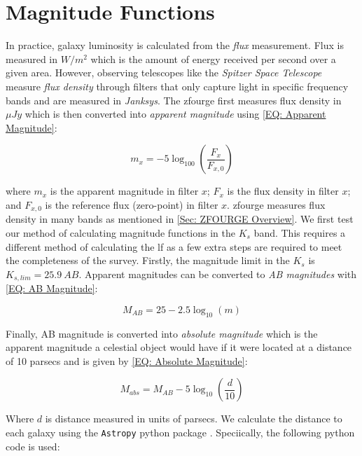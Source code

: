 \section{Magnitude Functions}

In practice, galaxy luminosity is calculated from the \textit{flux} measurement. Flux is measured in $W/m^2$ which is the amount of energy received per second over a given area. However, observing telescopes like the \textit{Spitzer Space Telescope} measure \textit{flux density} through filters that only capture light in specific frequency bands and are measured in \textit{Janksys}. The \gls{zfourge} first measures flux density in $\mu Jy$ which is then converted into \textit{apparent magnitude} using \cref{EQ: Apparent Magnitude}: 

\begin{equation}
    m_{x} = -5 \log_{100} \left(\frac{F_{x}}{F_{x,0}}\right)
    \label{EQ: Apparent Magnitude}
\end{equation}

where $m_x$ is the apparent magnitude in filter $x$; $F_x$ is the flux density in filter $x$; and $F_{x,0}$ is the reference flux (zero-point) in filter $x$. \gls{zfourge} measures flux density in many bands as mentioned in \cref{Sec: ZFOURGE Overview}. We first test our method of calculating magnitude functions in the $K_{s}$ band. This requires a different method of calculating the \gls{lf} as a few extra steps are required to meet the completeness of the survey. Firstly, the magnitude limit in the $K_{s}$ is $K_{s,lim} = 25.9\ AB$. Apparent magnitudes can be converted to \textit{AB magnitudes} with \cref{EQ: AB Magnitude}:

\begin{equation}
    M_{AB} = 25 - 2.5 \log_{10}(m)
    \label{EQ: AB Magnitude}
\end{equation}

Finally, AB magnitude is converted into \textit{absolute magnitude} which is the apparent magnitude a celestial object would have if it were located at a distance of 10 parsecs and is given by \cref{EQ: Absolute Magnitude}:

\begin{equation}
    M_{abs} = M_{AB} - 5 \log_{10} \left(\frac{d}{10}\right)
    \label{EQ: Absolute Magnitude}
\end{equation}

Where $d$ is distance measured in units of parsecs. We calculate the distance to each galaxy using the \texttt{Astropy} python package \citep{astropy_collaboration_astropy_2022}. Speciically, the following python code is used:

